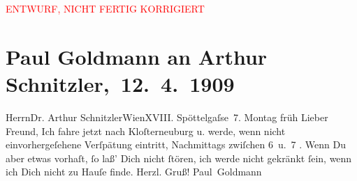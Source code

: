 
\begin{center}
            \textcolor{red}{ENTWURF, NICHT FERTIG KORRIGIERT}
                      \end{center}
            
         \renewcommand{\erwaehnteOrte}{Orte: Edmund-Weiß-Gasse, Klosterneuburg, Wien}
         \renewcommand{\erwaehnteWerke}{}
               \section[ Paul Goldmann an Arthur Schnitzler, 12. 4. 1909]{ Paul Goldmann an Arthur Schnitzler, 12. 4. 1909}\nopagebreak{}\rehead{ }\begin{ledgroupsized}[t]{13cm}\normalsize\beginnumbering \toendnotes[C]{\smallbreak\pagebreak[2]} 
\toendnotes[C]{\smallbreak}\pstart{}{\pb}Herrn\pend{}\pstart{}Dr. Arthur Schnitzler\pend{}\pstart{}Wien\pend{}\pstart{}XVIII. Spöttelgaſse 7.\pend{}{\bigskip}\pstart
           Montag{ }früh\pend
           \pstart
           Lieber Freund, Ich fahre jetzt nach Kloſterneuburg u. werde, wenn nicht einvorhergeſehene
               Verſpätung eintritt, Nachmittags zwiſchen 6 u. 7{ }\label{K_L03467-1v}\label{K_L03467-1h}. Wenn Du aber etwas vorhaſt, ſo laß’ Dich nicht ſtören, ich werde nicht
               gekränkt ſein, wenn ich Dich nicht zu Hauſe finde.\pend
           \pstart Herzl. Gruß! \spacefill\mbox{Paul Goldmann}\pend{}
         
         \endnumbering{}\end{ledgroupsized}\begin{anhang}\end{anhang}\newcommand{\dateiname}{L03467}\newcommand{\titel}{Paul Goldmann an Arthur Schnitzler, 12. 4. 1909}\newcommand{\editorInnen}{Martin Anton Müller und Laura Untner}
      